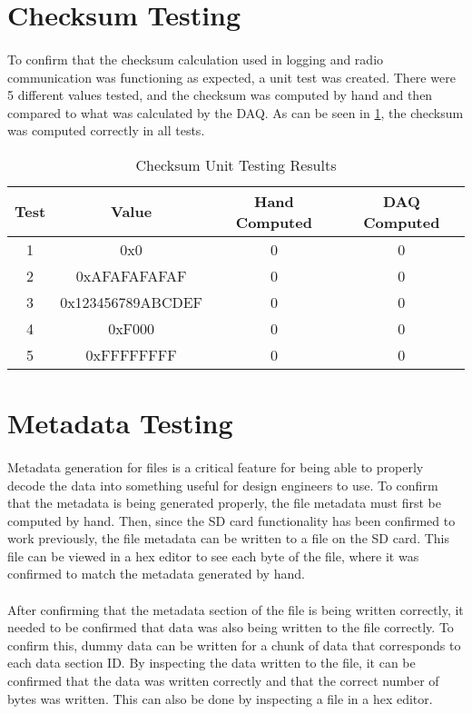 \section{Checksum Testing}

\paragraph{}
To confirm that the checksum calculation used in logging and radio communication was functioning as expected, a unit test was created.
There were 5 different values tested, and the checksum was computed by hand and then compared to what was calculated by the DAQ.
As can be seen in \cref{tab:ChecksumTesting}, the checksum was computed correctly in all tests.

\begin{table}[H] \label{tab:ChecksumTesting}
\caption{Checksum Unit Testing Results}
\centering
\begin{tabular}{c c c c}
\hline\hline
Test & Value & Hand Computed & DAQ Computed \\ [0.5ex]
\hline
1 & 0x0 & 0 & 0 \\
2 & 0xAFAFAFAFAF & 0 & 0 \\
3 & 0x123456789ABCDEF & 0 & 0 \\
4 & 0xF000 & 0 & 0 \\
5 & 0xFFFFFFFF & 0 & 0 \\ [1ex]
\hline
\end{tabular}
\end{table}

\section{Metadata Testing}

\paragraph{}
Metadata generation for files is a critical feature for being able to properly decode the data into something useful for design engineers to use.
To confirm that the metadata is being generated properly, the file metadata must first be computed by hand.
Then, since the SD card functionality has been confirmed to work previously, the file metadata can be written to a file on the SD card.
This file can be viewed in a hex editor to see each byte of the file, where it was confirmed to match the metadata generated by hand.

\paragraph{}
After confirming that the metadata section of the file is being written correctly, it needed to be confirmed that data was also being written to the file correctly.
To confirm this, dummy data can be written for a chunk of data that corresponds to each data section ID.
By inspecting the data written to the file, it can be confirmed that the data was written correctly and that the correct number of bytes was written.
This can also be done by inspecting a file in a hex editor.

